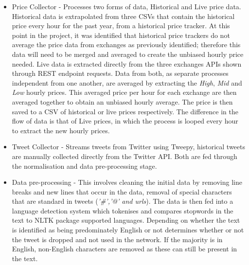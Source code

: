 \documentclass[oneside, 12pt]{article}
\begin{document}
		\begin{itemize}
			\item Price Collector - Processes two forms of data, Historical and Live price data. 
			\subitem Historical data is extrapolated from three CSVs that contain the historical price every hour for the past year, from a historical price tracker. At this point in the project, it was identified that historical price trackers do not average the price data from exchanges as previously identified; therefore this data will need to be merged and averaged to create the unbiased hourly price needed. 
			\subitem Live data is extracted directly from the three exchanges APIs shown through REST endpoint requests.
			\subitem Data from both, as separate processes independent from one another, are averaged by extracting the \textit{High}, \textit{Mid} and \textit{Low} hourly prices. This averaged price per hour for each exchange are then averaged together to obtain an unbiased hourly average. The price is then saved to a CSV of historical or live prices respectively. The difference in the flow of data is that of Live prices, in which the process is looped every hour to extract the new hourly prices. 
			\item Tweet Collector - Streams tweets from Twitter using Tweepy, historical tweets are manually collected directly from the Twitter API. Both are fed through the normalisation and data pre-processing stage.
			\item Data pre-processing - This involves cleaning the initial data by removing line breaks and new lines that occur in the data, removal of special characters that are standard in tweets (\textit{'\#','@' and urls}). The data is then fed into a language detection system which tokenises and compares stopwords in the text to NLTK package supported languages. Depending on whether the text is identified as being predominately English or not determines whether or not the tweet is dropped and not used in the network. If the majority is in English, non-English characters are removed as these can still be present in the text.
		\end{itemize}
	
\end{document}
